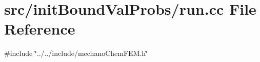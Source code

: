 \section{src/init\+Bound\+Val\+Probs/run.cc File Reference}
\label{run_8cc}
{\ttfamily \#include \char`\"{}../../include/mechano\+Chem\+F\+E\+M.\+h\char`\"{}}\newline

